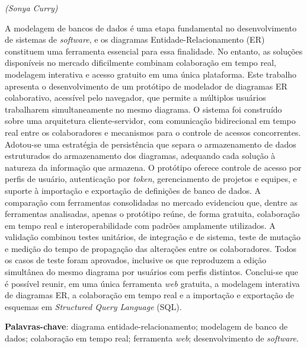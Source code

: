 \documentclass[
	12pt,			%
	openany,		%
	oneside,		%
	a4paper,		%
	english,		%
	brazil			%
	]{abntex2}
\begin{document}
\begin{epigrafe}
   \vspace*{\fill}
   \begin{flushright}
	\textit{
	(Sonya Curry) }
   \end{flushright}
\end{epigrafe}

\setlength{\absparsep}{18pt} %

\begin{resumo}
A modelagem de bancos de dados é uma etapa fundamental no desenvolvimento de sistemas de \textit{software}, e os diagramas Entidade-Relacionamento (ER) constituem uma ferramenta essencial para essa finalidade. No entanto, as soluções disponíveis no mercado dificilmente combinam colaboração em tempo real, modelagem interativa e acesso gratuito em uma única plataforma. Este trabalho apresenta o desenvolvimento de um protótipo de modelador de diagramas ER colaborativo, acessível pelo navegador, que permite a múltiplos usuários trabalharem simultaneamente no mesmo diagrama. O sistema foi construído sobre uma arquitetura cliente-servidor, com comunicação bidirecional em tempo real entre os colaboradores e mecanismos para o controle de acessos concorrentes. Adotou-se uma estratégia de persistência que separa o armazenamento de dados estruturados do armazenamento dos diagramas, adequando cada solução à natureza da informação que armazena. O protótipo oferece controle de acesso por perfis de usuário, autenticação por \textit{token}, gerenciamento de projetos e equipes, e suporte à importação e exportação de definições de banco de dados. A comparação com ferramentas consolidadas no mercado evidenciou que, dentre as ferramentas analisadas, apenas o protótipo reúne, de forma gratuita, colaboração em tempo real e interoperabilidade com padrões amplamente utilizados. A validação combinou testes unitários, de integração e de sistema, teste de mutação e medição do tempo de propagação das alterações entre os colaboradores. Todos os casos de teste foram aprovados, inclusive os que reproduzem a edição simultânea do mesmo diagrama por usuários com perfis distintos. Conclui-se que é possível reunir, em uma única ferramenta \textit{web} gratuita, a modelagem interativa de diagramas ER, a colaboração em tempo real e a importação e exportação de esquemas em \textit{Structured Query Language} (SQL).

\textbf{Palavras-chave}: diagrama entidade-relacionamento; modelagem de banco de dados; colaboração em tempo real; ferramenta \textit{web}; desenvolvimento de \textit{software}.
\end{resumo}
\end{document}
